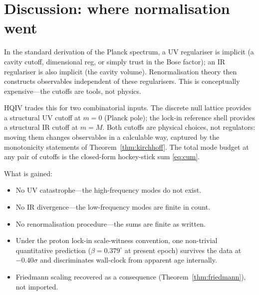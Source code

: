 \documentclass[11pt]{amsart}
\begin{document}
\section{Discussion: where normalisation went}\label{sec:discussion}

In the standard derivation of the Planck spectrum, a UV
regulariser is implicit (a cavity cutoff, dimensional reg,
or simply trust in the Bose factor); an IR regulariser is also
implicit (the cavity volume).  Renormalisation theory then
constructs observables independent of these regularisers.  This
is conceptually expensive---the cutoffs are tools, not physics.

HQIV trades this for two combinatorial inputs.  The discrete null
lattice provides a structural UV cutoff at $m=0$ (Planck pole);
the lock-in reference shell provides a structural IR cutoff at
$m=M$.  Both cutoffs are physical choices, not regulators: moving
them changes observables in a calculable way, captured by the
monotonicity statements of Theorem~\ref{thm:kirchhoff}.  The
total mode budget at any pair of cutoffs is the closed-form
hockey-stick sum \eqref{eq:cum}.

What is gained:
\begin{itemize}[leftmargin=2em]
\item No UV catastrophe---the high-frequency modes do not exist.
\item No IR divergence---the low-frequency modes are finite in
  count.
\item No renormalisation procedure---the sums are finite as
  written.
\item Under the proton lock-in scale-witness convention, one
  non-trivial quantitative prediction ($\beta=0.379^\circ$ at
  present epoch) survives the data at $-0.40\sigma$ and
  discriminates wall-clock from apparent age internally.
\item Friedmann scaling recovered as a consequence
  (Theorem~\ref{thm:friedmann}), not imported.
\end{itemize}
\end{document}
